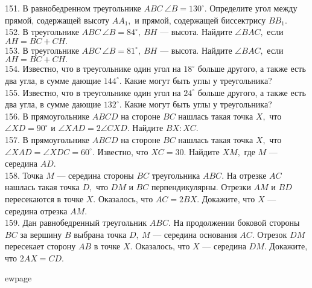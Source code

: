 151. В равнобедренном треугольнике $ABC\ \angle B = 130^\circ.$ Определите угол между прямой, содержащей высоту $AA_1,$ и прямой, содержащей биссектрису $BB_1.$\\
152. В треугольнике $ABC\ \angle B = 84^\circ,\ BH$ --- высота. Найдите $\angle BAC,$ если $AH=BC+CH.$\\
153. В треугольнике $ABC\ \angle B = 81^\circ,\ BH$ --- высота. Найдите $\angle BAC,$ если $AH=BC+CH.$\\
154. Известно, что в треугольнике один угол на $18^\circ$ больше другого, а также есть два угла, в сумме дающие $144^\circ.$ Какие могут быть углы у треугольника?\\
155. Известно, что в треугольнике один угол на $24^\circ$ больше другого, а также есть два угла, в сумме дающие $132^\circ.$ Какие могут быть углы у треугольника?\\
156. В прямоугольнике $ABCD$ на стороне $BC$ нашлась такая точка $X,$ что $\angle XD = 90^\circ$ и $\angle XAD =2\angle CXD.$ Найдите $BX : XC.$\\
157. В прямоугольнике $ABCD$ на стороне $BC$ нашлась такая точка $X,$ что $\angle XAD = \angle XDC = 60^\circ.$ Известно, что $XC = 30.$ Найдите $XM,$ где $M$ — середина $AD.$\\
158. Точка $M$ --- середина стороны $BC$ треугольника $ABC.$ На отрезке $AC$ нашлась такая точка $D,$ что $DM$ и $BC$ перпендикулярны. Отрезки $AM$ и $BD$ пересекаются в точке $X.$ Оказалось, что
$AC = 2BX.$ Докажите, что $X$ --- середина отрезка $AM.$\\
159. Дан равнобедренный треугольник $ABC.$ На продолжении боковой стороны $BC$ за вершину $B$ выбрана точка $D,\ M$ --- середина основания $AC.$
Отрезок $DM$ пересекает сторону $AB$ в точке $X.$ Оказалось, что $X$ --- середина $DM.$ Докажите, что $2AX = CD.$

ewpage
